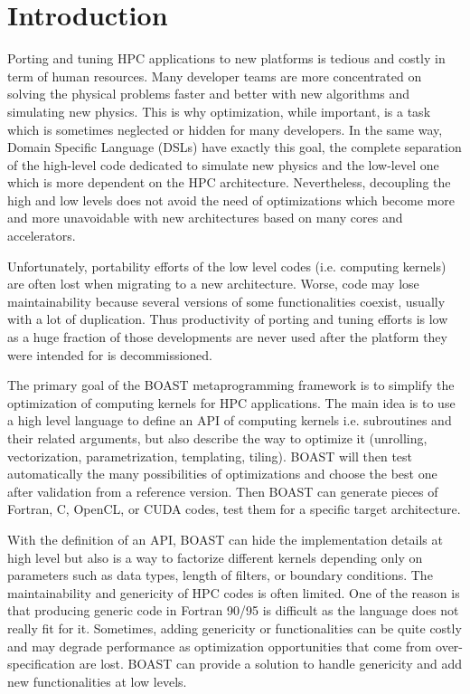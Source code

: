 \documentclass{IEEEtran}
\begin{document}
\section{Introduction}

Porting and tuning HPC applications to new platforms is tedious and costly in
term of human resources.  Many developer teams are more concentrated on solving
the physical problems faster and better with new algorithms and simulating new
physics. This is why optimization, while important, is a task which is
sometimes neglected or hidden for many developers.  In the same way, Domain
Specific Language (DSLs) have exactly this goal, the complete separation of the
high-level code dedicated to simulate new physics and the low-level one which
is more dependent on the HPC architecture. Nevertheless, decoupling the high
and low levels does not avoid the need of optimizations which become more and
more unavoidable with new architectures based on many cores and accelerators.

Unfortunately, portability efforts of the low level codes (i.e. computing
kernels) are often lost when migrating to a new architecture. Worse, code may
lose maintainability because several versions of some functionalities coexist,
usually with a lot of duplication.  Thus productivity of porting and tuning
efforts is low as a huge fraction of those developments are never used after
the platform they were intended for is decommissioned.

The primary goal of the BOAST metaprogramming framework is to simplify the
optimization of computing kernels for HPC applications. The main idea is to use
a high level language to define an API of computing kernels i.e. subroutines
and their related arguments, but also describe the way to optimize it
(unrolling, vectorization, parametrization, templating, tiling). BOAST will
then test automatically the many possibilities of optimizations and choose the
best one after validation from a reference version. Then BOAST can generate
pieces of Fortran, C, OpenCL, or CUDA codes, test them for a specific target
architecture.

With the definition of an API, BOAST can hide the implementation details at
high level but also is a way to factorize different kernels depending only on
parameters such as data types, length of filters, or boundary conditions. The
maintainability and genericity of HPC codes is often limited. One of the reason
is that producing generic code in Fortran 90/95 is difficult as the language
does not really fit for it. Sometimes, adding genericity or functionalities can
be quite costly and may degrade performance as optimization opportunities that
come from over-specification are lost. BOAST can provide a solution to handle
genericity and add new functionalities at low levels.
\end{document}
